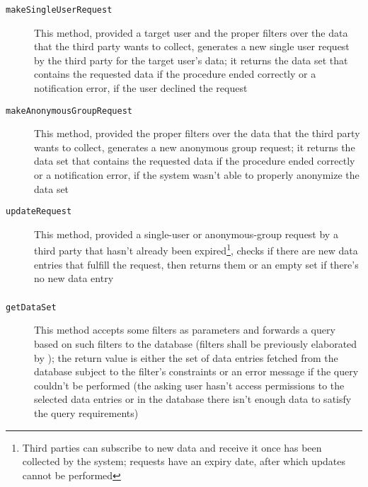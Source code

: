 \documentclass[../DD0.tex]{subfiles}
\begin{document}
    \subsubsection{\RequestManager}

      \begin{description}
        \item[\texttt{makeSingleUserRequest}] This method, provided a target user and the proper filters over the data that the third party wants to collect, generates a new single user request by the third party for the target user's data; it returns the data set that contains the requested data if the procedure ended correctly or a notification error, if the user declined the request
        \item[\texttt{makeAnonymousGroupRequest}] This method, provided the proper filters over the data that the third party wants to collect, generates a new anonymous group request; it returns the data set that contains the requested data if the procedure ended correctly or a notification error, if the system wasn't able to properly anonymize the data set
        \item[\texttt{updateRequest}] This method, provided a single-user or anonymous-group request by a third party that hasn't already been expired\footnote{Third parties can subscribe to new data and receive it once has been collected by the system; requests have an expiry date, after which updates cannot be performed}, checks if there are new data entries that fulfill the request, then returns them or an empty set if there's no new data entry
      \end{description}

    \subsubsection{\SetBuilder}

      \begin{description}
        \item[\texttt{getDataSet}] This method accepts some filters as parameters and forwards a query based on such filters to the database (filters shall be previously elaborated by \FilterManager); the return value is either the set of data entries fetched from the database subject to the filter's constraints or an error message if the query couldn't be performed (the asking user hasn't access permissions to the selected data entries or in the database there isn't enough data to satisfy the query requirements)
      \end{description}
\end{document}
